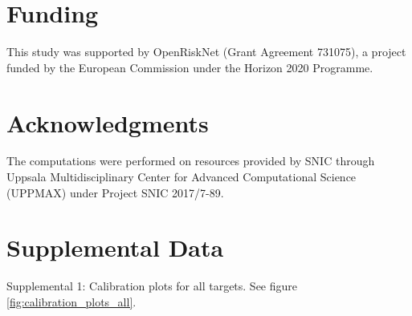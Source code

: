 \documentclass[10pt,article]{memoir}
\begin{document}

\section*{Funding}
This study was supported by OpenRiskNet (Grant Agreement 731075), a project
funded by the European Commission under the Horizon 2020 Programme.

\section*{Acknowledgments}
The computations were performed on resources provided by SNIC through Uppsala
Multidisciplinary Center for Advanced Computational Science (UPPMAX) under
Project SNIC 2017/7-89.



\newpage
\appendix
\section*{Supplemental Data}
%
%

Supplemental 1: Calibration plots for all targets. See figure
\ref{fig:calibration_plots_all}.
\end{document}
